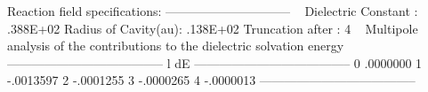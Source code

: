 \begin{sourcelisting}
      Reaction field specifications:
      ------------------------------
~
       Dielectric Constant :                  .388E+02
       Radius of Cavity(au):                  .138E+02
       Truncation after    :                 4
~
      Multipole analysis of the contributions to the dielectric solvation energy
~
      --------------------------------------
         l             dE
      --------------------------------------
         0            .0000000
         1           -.0013597
         2           -.0001255
         3           -.0000265
         4           -.0000013
      --------------------------------------
\end{sourcelisting}

%
%
%
%
%
